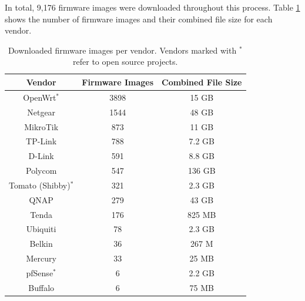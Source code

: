 In total, 9,176 firmware images were downloaded throughout this process. Table \ref{tab:scraper} shows the number of firmware images and their combined file size for each vendor.

\begin{table}[H]
\centering
\caption{Downloaded firmware images per vendor. Vendors marked with $^*$ refer to open source projects.}
\begin{tabular}{|c|c|c|}
\hline
\textbf{Vendor} & \textbf{Firmware Images} & \textbf{Combined File Size} \\ \hline
OpenWrt$^*$     & 3898                     & 15 GB                       \\ 
Netgear         & 1544                     & 48 GB                       \\ 
MikroTik        & 873                      & 11 GB                       \\ 
TP-Link         & 788                      & 7.2 GB                      \\ 
D-Link          & 591                      & 8.8 GB                      \\ 
Polycom         & 547                      & 136 GB                      \\ 
Tomato (Shibby)$^*$ & 321                      & 2.3 GB                      \\ 
QNAP            & 279                      & 43 GB                       \\ 
Tenda           & 176                      & 825 MB                      \\ 
Ubiquiti        & 78                       & 2.3 GB                      \\ 
Belkin          & 36                       & 267 M                       \\ 
Mercury         & 33                       & 25 MB                       \\ 
pfSense$^*$     & 6                        & 2.2 GB                      \\ 
Buffalo         & 6                        & 75 MB                       \\ \hline

\end{tabular}
\label{tab:scraper}
\end{table}


